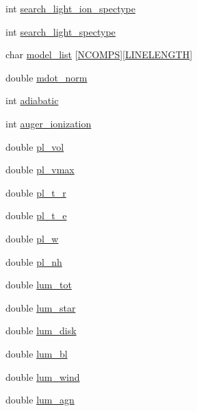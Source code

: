 \begin{DoxyCompactItemize}
\item 
int \hyperlink{structgeometry_a436c47c4ad0c971b33e41cd1448ba572}{search\+\_\+light\+\_\+ion\+\_\+spectype}
\item 
int \hyperlink{structgeometry_ad81a455ae43e24f269b3ca7b989c84e9}{search\+\_\+light\+\_\+spectype}
\item 
char \hyperlink{structgeometry_a0fa9b4b736998442e6971b5ed75f102d}{model\+\_\+list} \mbox{[}\hyperlink{python_8h_a060fae9f08d64907d8eb54a79e2defa8}{N\+C\+O\+M\+PS}\mbox{]}\mbox{[}\hyperlink{xlog_8c_a10e8c7b8458375c3dbfbb4010a2aba8c}{L\+I\+N\+E\+L\+E\+N\+G\+TH}\mbox{]}
\item 
double \hyperlink{structgeometry_a68afc43b64c264eab0386bb00e931ad6}{mdot\+\_\+norm}
\item 
int \hyperlink{structgeometry_a4f5794e0b4b6ed3e93a1cbd284132a17}{adiabatic}
\item 
int \hyperlink{structgeometry_a2aa7780d01076f9c70aef2ea263276f9}{auger\+\_\+ionization}
\item 
double \hyperlink{structgeometry_a75aa5a138eaaeb26abdf52bd03dc096a}{pl\+\_\+vol}
\item 
double \hyperlink{structgeometry_a6d53080754f74d86d5677a6bef475cfb}{pl\+\_\+vmax}
\item 
double \hyperlink{structgeometry_ab2863864290d21c314d4b9000e8cb3c1}{pl\+\_\+t\+\_\+r}
\item 
double \hyperlink{structgeometry_abeaa6daddc4cf0043c51162b4012b4c4}{pl\+\_\+t\+\_\+e}
\item 
double \hyperlink{structgeometry_aa6b11137b5640890d422ec8295f3db28}{pl\+\_\+w}
\item 
double \hyperlink{structgeometry_ad3248dbaffd722b3eeaf3431dbd49ec7}{pl\+\_\+nh}
\item 
double \hyperlink{structgeometry_a0da2350b57744503e3459adb9e511366}{lum\+\_\+tot}
\item 
double \hyperlink{structgeometry_acb8d45c71d7042bd1af56bafe158a10a}{lum\+\_\+star}
\item 
double \hyperlink{structgeometry_aaf19a215b47f87b86755371bf9e1f6ce}{lum\+\_\+disk}
\item 
double \hyperlink{structgeometry_aa2ea17f8b23e8e3785c3685c9261a8bf}{lum\+\_\+bl}
\item 
double \hyperlink{structgeometry_a12cbfe61b17a74b174a5c7eb8d9dc633}{lum\+\_\+wind}
\item 
double \hyperlink{structgeometry_afc49d7aa9f0e9c5792dc2ba38a66a0ab}{lum\+\_\+agn}
\item 

\end{DoxyCompactItemize}
